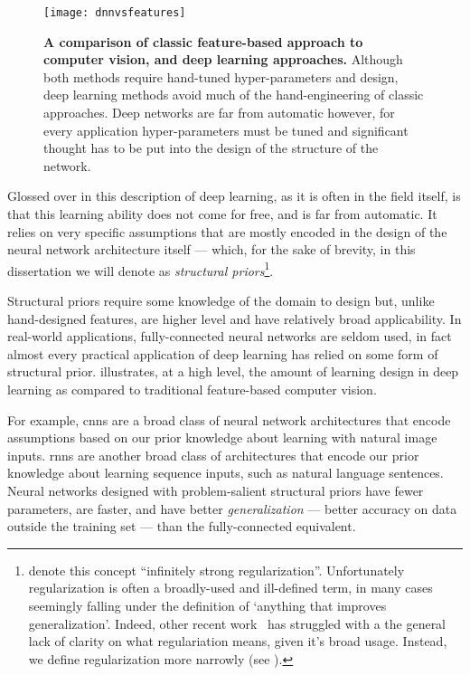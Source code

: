 \documentclass[thesis]{subfiles}
\begin{document}
\begin{figure}[tbp]
	\centering
	\texttt{[image: dnnvsfeatures]}
	\caption[Classic feature-based approach \vs{} deep learning]{\textbf{A comparison of classic feature-based approach to computer vision, and deep learning approaches.} Although both methods require hand-tuned hyper-parameters and design, deep learning methods avoid much of the hand-engineering of classic approaches. Deep networks are far from automatic however, for every application hyper-parameters must be tuned and significant thought has to be put into the design of the structure of the network.}\label{dnnvsfeatures}
\end{figure}
	
Glossed over in this description of deep learning, as it is often in the field itself, is that this learning ability does not come for free, and is far from automatic. It relies on very specific assumptions that are mostly encoded in the design of the neural network architecture itself --- which, for the sake of brevity, in this dissertation we will denote as \emph{structural priors}\footnote{\citet{goodfellow2016deep} denote this concept ``infinitely strong regularization''. Unfortunately regularization is often a broadly-used and ill-defined term, in many cases seemingly falling under the definition of `anything that improves generalization'. Indeed, other recent work~\citep{rethinking2016} has struggled with a the general lack of clarity on what regulariation means, given it's broad usage. Instead, we define \gls{regularization} more narrowly (see ). }.

Structural priors require some knowledge of the domain to design but, unlike hand-designed features, are higher level and have relatively broad applicability. In real-world applications, fully-connected neural networks are seldom used, in fact almost every practical application of deep learning has relied on some form of structural prior.  illustrates, at a high level, the amount of learning \vs design in deep learning as compared to traditional feature-based computer vision.

For example, \glspl{cnn} are a broad class of neural network architectures that encode assumptions based on our prior knowledge about learning with natural image inputs. \Glspl{rnn} are another broad class of architectures that encode our prior knowledge about learning sequence inputs, such as natural language sentences. Neural networks designed with problem-salient structural priors have fewer parameters, are faster, and have better \emph{generalization} --- better accuracy on data outside the training set --- than the fully-connected equivalent.
\end{document}
